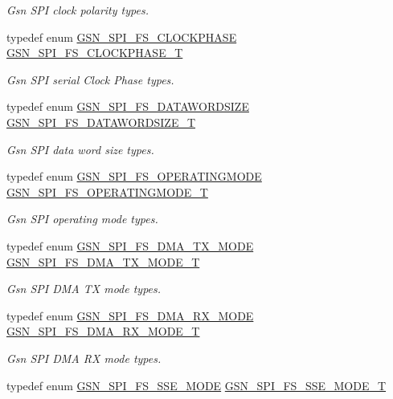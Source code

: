 \begin{DoxyCompactItemize}
\begin{DoxyCompactList}\small\item\em Gsn SPI clock polarity types. \end{DoxyCompactList}\item 
typedef enum \hyperlink{a00655_gae764e5eefaf1dedaf1561a7cd3ccb6aa}{GSN\_\-SPI\_\-FS\_\-CLOCKPHASE} \hyperlink{a00655_gaf3bb2adb7491e3d235c486d48f1b506d}{GSN\_\-SPI\_\-FS\_\-CLOCKPHASE\_\-T}
\begin{DoxyCompactList}\small\item\em Gsn SPI serial Clock Phase types. \end{DoxyCompactList}\item 
typedef enum \hyperlink{a00655_ga14e8640824b36f8fbc046289a0fef146}{GSN\_\-SPI\_\-FS\_\-DATAWORDSIZE} \hyperlink{a00655_gaad2f137ab7bba85003348a4b895e435d}{GSN\_\-SPI\_\-FS\_\-DATAWORDSIZE\_\-T}
\begin{DoxyCompactList}\small\item\em Gsn SPI data word size types. \end{DoxyCompactList}\item 
typedef enum \hyperlink{a00655_ga9ef97e579e4f3e5d828b8bc2c0c58d73}{GSN\_\-SPI\_\-FS\_\-OPERATINGMODE} \hyperlink{a00655_gab173e44df6afa7f56b96f3a05cb857a5}{GSN\_\-SPI\_\-FS\_\-OPERATINGMODE\_\-T}
\begin{DoxyCompactList}\small\item\em Gsn SPI operating mode types. \end{DoxyCompactList}\item 
typedef enum \hyperlink{a00655_ga6654fba1f3e49677837484ec989da884}{GSN\_\-SPI\_\-FS\_\-DMA\_\-TX\_\-MODE} \hyperlink{a00655_ga6203f693749188e8f14ff1675d2eb40f}{GSN\_\-SPI\_\-FS\_\-DMA\_\-TX\_\-MODE\_\-T}
\begin{DoxyCompactList}\small\item\em Gsn SPI DMA TX mode types. \end{DoxyCompactList}\item 
typedef enum \hyperlink{a00655_ga82f3e42cd7181328045726b29cf916c6}{GSN\_\-SPI\_\-FS\_\-DMA\_\-RX\_\-MODE} \hyperlink{a00655_ga9bb270ede7d3ddae0e748f7927ad00bd}{GSN\_\-SPI\_\-FS\_\-DMA\_\-RX\_\-MODE\_\-T}
\begin{DoxyCompactList}\small\item\em Gsn SPI DMA RX mode types. \end{DoxyCompactList}\item 
typedef enum \hyperlink{a00655_ga9d787cd2d26e81bd00ce1a1392958e27}{GSN\_\-SPI\_\-FS\_\-SSE\_\-MODE} \hyperlink{a00655_ga05ccf14c3c0d97e7e9fb2d52bf5081de}{GSN\_\-SPI\_\-FS\_\-SSE\_\-MODE\_\-T}

\end{DoxyCompactItemize}
